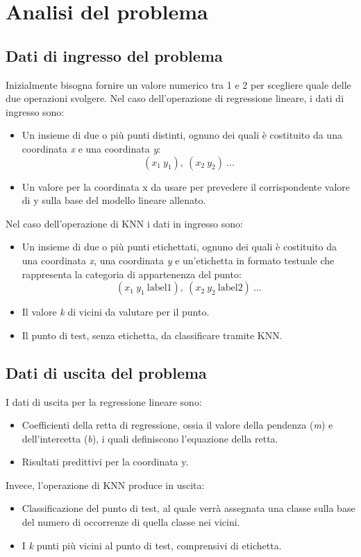 \documentclass[11pt]{article}
\theoremstyle{definition}
\begin{document}
\newpage

\section{Analisi del problema}

\subsection{Dati di ingresso del problema}
Inizialmente bisogna fornire un valore numerico tra 1 e 2 per scegliere quale delle due operazioni svolgere. Nel caso dell'operazione di regressione lineare, i dati di ingresso sono:
\begin{itemize}
\item Un insieme di due o più punti distinti, ognuno dei quali è costituito da una coordinata \textit{x} e una coordinata \textit{y}:
$$(x_1 \ y_1),\  (x_2 \ y_2) \ \dots $$
\item Un valore per la coordinata x da usare per prevedere il corrispondente valore di y sulla base del modello lineare allenato.
\end{itemize}
Nel caso dell'operazione di KNN i dati in ingresso sono:
\begin{itemize}
\item Un insieme di due o più punti etichettati, ognuno dei quali è costituito da una coordinata \textit{x}, una coordinata \textit{y} e un'etichetta in formato testuale che rappresenta la categoria di appartenenza del punto:
$$
(x_1 \ y_1 \ \text{label1}),\  (x_2 \ y_2 \ \text{label2}) \ \dots 
$$
\item Il valore \textit{k} di vicini da valutare per il punto.
\item Il punto di test, senza etichetta, da classificare tramite KNN.
\end{itemize}

\subsection{Dati di uscita del problema}
I dati di uscita per la regressione lineare sono:
\begin{itemize}
\item Coefficienti della retta di regressione, ossia il valore della pendenza (\textit{m}) e dell'intercetta (\textit{b}), i quali definiscono l'equazione della retta.
\item Risultati predittivi per la coordinata y.
\end{itemize}
Invece, l'operazione di KNN produce in uscita:
\begin{itemize}
\item Classificazione del punto di test, al quale verrà assegnata una classe sulla base del numero di occorrenze di quella classe nei vicini.
\item I \textit{k} punti più vicini al punto di test, comprensivi di etichetta.
\end{itemize}
\end{document}
